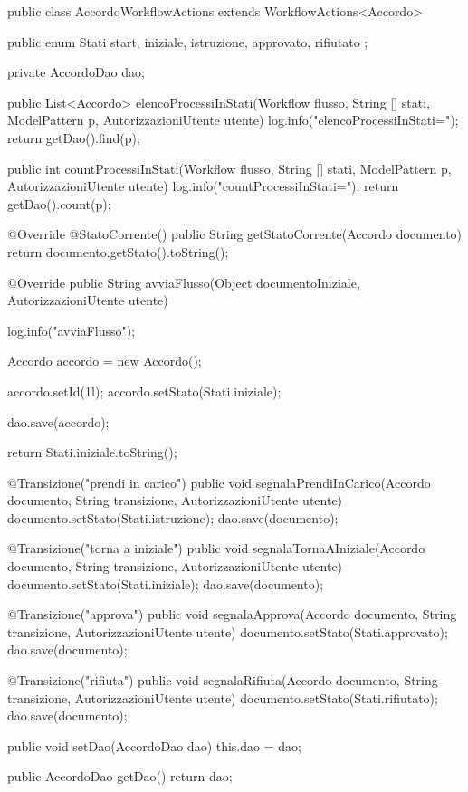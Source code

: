\begin{java}
public class AccordoWorkflowActions 
   extends WorkflowActions<Accordo> {
  
  public enum Stati {
    start, iniziale, istruzione, approvato, rifiutato
  };
  
  private AccordoDao dao;
  
  public List<Accordo> elencoProcessiInStati(Workflow flusso, String [] stati, ModelPattern p, AutorizzazioniUtente utente)
  {
    log.info("elencoProcessiInStati=");
    return getDao().find(p); 
  }
  
  public int countProcessiInStati(Workflow flusso, String [] stati, ModelPattern p, AutorizzazioniUtente utente) 
  {
    log.info("countProcessiInStati=");
    return getDao().count(p);
  }
  
    @Override
  @StatoCorrente()
  public String getStatoCorrente(Accordo documento)
  {
    return documento.getStato().toString();
  }
  
  @Override
  public String avviaFlusso(Object documentoIniziale, AutorizzazioniUtente utente) {
    log.info("avviaFlusso");
    
    Accordo accordo = new Accordo();
    
    accordo.setId(1l);
    accordo.setStato(Stati.iniziale);
    
    dao.save(accordo);
    
    return Stati.iniziale.toString();
  }
  
  @Transizione("prendi in carico")
  public void segnalaPrendiInCarico(Accordo documento, String transizione, AutorizzazioniUtente utente) {
    documento.setStato(Stati.istruzione);
    dao.save(documento);
  }

  @Transizione("torna a iniziale")
  public void segnalaTornaAIniziale(Accordo documento, String transizione, AutorizzazioniUtente utente) {
    documento.setStato(Stati.iniziale);
    dao.save(documento);
  }

  @Transizione("approva")
  public void segnalaApprova(Accordo documento, String transizione, AutorizzazioniUtente utente) {
    documento.setStato(Stati.approvato);
    dao.save(documento);
  }

  @Transizione("rifiuta")
  public void segnalaRifiuta(Accordo documento, String transizione, AutorizzazioniUtente utente) {
    documento.setStato(Stati.rifiutato);
    dao.save(documento);
  }

  public void setDao(AccordoDao dao) {
    this.dao = dao;
  }

  public AccordoDao getDao() {
    return dao;
  }

}

\end{java}


